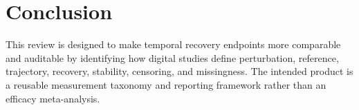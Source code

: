 \section{Conclusion}

This review is designed to make temporal recovery endpoints more comparable and auditable by identifying how digital studies define perturbation, reference, trajectory, recovery, stability, censoring, and missingness. The intended product is a reusable measurement taxonomy and reporting framework rather than an efficacy meta-analysis.
